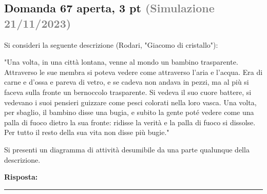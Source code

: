 \documentclass[a4paper,11pt]{article}
\begin{document}
\subsection*{Domanda 67 \hfill {\small aperta, 3 pt \textcolor{gray}{(Simulazione 21/11/2023)}}}
\begin{tcolorbox}[colback=gray!8,colframe=gray!50,title=Contesto]
Si consideri la seguente descrizione (Rodari, "Giacomo di cristallo"):

"Una volta, in una città lontana, venne al mondo un bambino trasparente. Attraverso le sue membra si poteva vedere come attraverso l'aria e l'acqua. Era di carne e d'ossa e pareva di vetro, e se cadeva non andava in pezzi, ma al più si faceva sulla fronte un bernoccolo trasparente. Si vedeva il suo cuore battere, si vedevano i suoi pensieri guizzare come pesci colorati nella loro vasca. Una volta, per sbaglio, il bambino disse una bugia, e subito la gente poté vedere come una palla di fuoco dietro la sua fronte: ridisse la verità e la palla di fuoco si dissolse. Per tutto il resto della sua vita non disse più bugie."
\end{tcolorbox}
Si presenti un diagramma di attività desumibile da una parte qualunque della descrizione.

\vspace{0.2cm}
\noindent\textbf{Risposta:}\par
\vspace{4cm}\hrule


\end{document}
